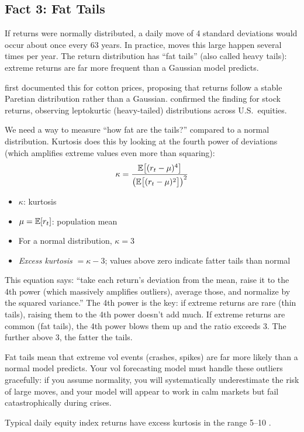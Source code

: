 \subsection{Fact 3: Fat Tails}
\label{sec:fact-fat-tails}

If returns were normally distributed, a daily move of 4 standard deviations would occur about once every 63 years.
In practice, moves this large happen several times per year.
The return distribution has ``fat tails'' (also called heavy tails): extreme returns are far more frequent than a Gaussian model predicts.

\citet{Mandelbrot1963} first documented this for cotton prices, proposing that returns follow a stable Paretian distribution rather than a Gaussian.
\citet{Fama1965} confirmed the finding for stock returns, observing leptokurtic (heavy-tailed) distributions across U.S.\ equities.

\begin{definition}[Kurtosis]
We need a way to measure ``how fat are the tails?'' compared to a normal distribution.
Kurtosis does this by looking at the fourth power of deviations (which amplifies extreme values even more than squaring):
\begin{equation}
  \kappa = \frac{\mathbb{E}\bigl[(r_t - \mu)^4\bigr]}{\bigl(\mathbb{E}\bigl[(r_t - \mu)^2\bigr]\bigr)^2}
  \label{eq:kurtosis}
\end{equation}
\begin{itemize}[nosep]
  \item $\kappa$: kurtosis
  \item $\mu = \mathbb{E}[r_t]$: population mean
  \item For a normal distribution, $\kappa = 3$
  \item \emph{Excess kurtosis} $= \kappa - 3$; values above zero indicate fatter tails than normal
\end{itemize}

\begin{intuition}
This equation says: ``take each return's deviation from the mean, raise it to the 4th power (which massively amplifies outliers), average those, and normalize by the squared variance.''
The 4th power is the key: if extreme returns are rare (thin tails), raising them to the 4th power doesn't add much.
If extreme returns are common (fat tails), the 4th power blows them up and the ratio exceeds 3.
The further above 3, the fatter the tails.
\end{intuition}

\begin{projectconnection}
Fat tails mean that extreme vol events (crashes, spikes) are far more likely than a normal model predicts.
Your vol forecasting model must handle these outliers gracefully: if you assume normality, you will systematically underestimate the risk of large moves, and your model will appear to work in calm markets but fail catastrophically during crises.
\end{projectconnection}

Typical daily equity index returns have excess kurtosis in the range 5--10 \citep{Cont2001}.
\end{definition}

